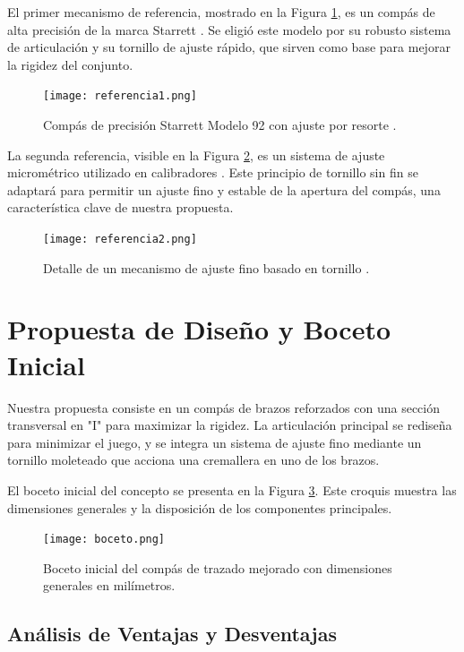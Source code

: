 \documentclass[11pt, a4paper]{article}
\begin{document}
El primer mecanismo de referencia, mostrado en la Figura \ref{fig:ref1}, es un compás de alta precisión de la marca Starrett \cite{starrett_compass}. Se eligió este modelo por su robusto sistema de articulación y su tornillo de ajuste rápido, que sirven como base para mejorar la rigidez del conjunto.

\begin{figure}[H]
    \centering
    \texttt{[image: referencia1.png]} %
    \caption{Compás de precisión Starrett Modelo 92 con ajuste por resorte \cite{starrett_compass}.}
    \label{fig:ref1}
\end{figure}

La segunda referencia, visible en la Figura \ref{fig:ref2}, es un sistema de ajuste micrométrico utilizado en calibradores \cite{pytel_dinamica}. Este principio de tornillo sin fin se adaptará para permitir un ajuste fino y estable de la apertura del compás, una característica clave de nuestra propuesta.

\begin{figure}[H]
    \centering
    \texttt{[image: referencia2.png]} %
    \caption{Detalle de un mecanismo de ajuste fino basado en tornillo \cite{pytel_dinamica}.}
    \label{fig:ref2}
\end{figure}

\section{Propuesta de Diseño y Boceto Inicial}
Nuestra propuesta consiste en un compás de brazos reforzados con una sección transversal en "I" para maximizar la rigidez. La articulación principal se rediseña para minimizar el juego, y se integra un sistema de ajuste fino mediante un tornillo moleteado que acciona una cremallera en uno de los brazos.

El boceto inicial del concepto se presenta en la Figura \ref{fig:boceto}. Este croquis muestra las dimensiones generales y la disposición de los componentes principales.

\begin{figure}[H]
    \centering
    \texttt{[image: boceto.png]} %
    \caption{Boceto inicial del compás de trazado mejorado con dimensiones generales en milímetros.}
    \label{fig:boceto}
\end{figure}

\subsection{Análisis de Ventajas y Desventajas}
\end{document}
